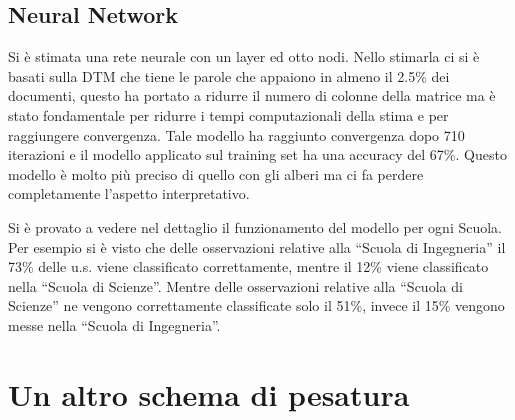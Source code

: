 \documentclass[10pt,a4paper,twoside]{tau-book}
\begin{document}
\subsection{Neural Network}

Si è stimata una rete neurale con un layer ed otto nodi. Nello stimarla ci si è basati sulla DTM che tiene le parole che appaiono in almeno il 2.5\% dei documenti, questo ha portato a ridurre il numero di colonne della matrice ma è stato fondamentale per ridurre i tempi computazionali della stima e per raggiungere convergenza. Tale modello ha raggiunto convergenza dopo 710 iterazioni e il modello applicato sul training set ha una accuracy del 67\%. Questo modello è molto più preciso di quello con gli alberi ma ci fa perdere completamente l’aspetto interpretativo.

Si è provato a vedere nel dettaglio il funzionamento del modello per ogni Scuola. Per esempio si è visto che delle osservazioni relative alla “Scuola di Ingegneria” il 73\% delle u.s. viene classificato correttamente, mentre il 12\% viene classificato nella “Scuola di Scienze”. Mentre delle osservazioni relative alla “Scuola di Scienze” ne vengono correttamente classificate solo il 51\%, invece il 15\% vengono messe nella “Scuola di Ingegneria”.

\section{Un altro schema di pesatura}
\end{document}
